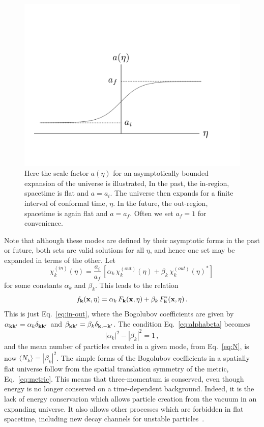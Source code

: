 \documentclass[12pt,onecolumn,eqsecnum,floats,aps,prd,floatfix,titlepage,tightenlines]{revtex4-2}
\begin{document}
\begin{figure}[htbp]
\includegraphics[scale=0.4]{bounded-expansion}
\caption{Here the scale factor $a(\eta)$ for an asymptotically bounded expansion of the universe is illustrated,
In the past, the in-region, spacetime is flat and $a=a_i$. The universe then expands for a finite interval of conformal
time, $\eta$. In the future, the out-region, spacetime is again flat and  $a=a_f$. Often we set $a_f = 1$ for convenience.}
\label{fig:boundedexpansion}
\end{figure}


Note that although these modes are defined by their asymptotic forms in the past or future, both sets are
valid solutions for all $\eta$, and hence one set may be expanded in terms of the other. Let
 \begin{equation}
  \chi_k^{(in)}(\eta) = \frac{a_i}{a_f}\, [\alpha_k\, \chi_k^{(out)}(\eta) + \beta_k\, \chi_k^{(out)}(\eta)^*]\,
  \label{eq:chi-alphabeta}
 \end{equation}
for some constants $\alpha_k$ and $\beta_k$. This leads to the relation
 \begin{equation}
 f_{\bf k}({\bf x},\eta)= \alpha_k\,  F_{\bf k}({\bf x},\eta) + \beta_k \, F^*_{\bf k}({\bf x},\eta) \,.
 \end{equation}
This is just Eq.~\eqref{eq:in-out}, where  the Bogolubov coefficients are given 
by $\alpha_{\bf k k'} = \alpha_k \delta_{\bf k k'}$ and $\beta_{\bf k k'} = \beta_k \delta_{\bf k, -k'}$.
The condition Eq.~\eqref{eq:alphabeta} becomes
 \begin{equation}
 |\alpha_k|^2 -  |\beta_k|^2 = 1\,,
 \label{eq:alphabeta2}
 \end{equation}
 and the mean number of particles created in a given mode, from Eq.~\eqref{eq:N}, is now $\langle N_k \rangle =  |\beta_k|^2$.
 The simple forms of the Bogolubov coefficients in a spatially flat universe follow from the spatial
 translation symmetry of the metric, Eq.~\eqref{eq:metric}. This means that three-momentum is conserved,
 even though energy is no longer conserved on a time-dependent background.  Indeed, it is the lack of energy conservarion 
 which allows particle creation from the vacuum in an expanding universe. It also allows other processes which are forbidden
 in flat spacetime, including new decay channels for unstable particles~\cite{Ford82,Lankinen18}. 
 
\end{document}
